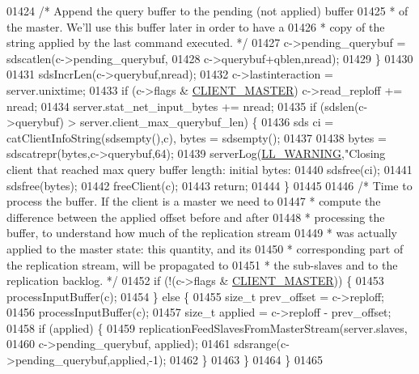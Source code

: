 \begin{DoxyCode}
{{{{{{{{{{{{{{{{01424         \textcolor{comment}{/* Append the query buffer to the pending (not applied) buffer}
01425 \textcolor{comment}{         * of the master. We'll use this buffer later in order to have a}
01426 \textcolor{comment}{         * copy of the string applied by the last command executed. */}
01427         c->pending\_querybuf = sdscatlen(c->pending\_querybuf,
01428                                         c->querybuf+qblen,nread);
01429     \}
01430 
01431     sdsIncrLen(c->querybuf,nread);
01432     c->lastinteraction = server.unixtime;
01433     \textcolor{keywordflow}{if} (c->flags & \hyperlink{server_8h_a3d8f0cc8d0653ee2b6dafb454292c069}{CLIENT\_MASTER}) c->read\_reploff += nread;
01434     server.stat\_net\_input\_bytes += nread;
01435     \textcolor{keywordflow}{if} (sdslen(c->querybuf) > server.client\_max\_querybuf\_len) \{
01436         sds ci = catClientInfoString(sdsempty(),c), bytes = sdsempty();
01437 
01438         bytes = sdscatrepr(bytes,c->querybuf,64);
01439         serverLog(\hyperlink{server_8h_a31229b9334bba7d6be2a72970967a14b}{LL\_WARNING},\textcolor{stringliteral}{"Closing client that reached max query buffer length: %
       initial bytes: %
01440         sdsfree(ci);
01441         sdsfree(bytes);
01442         freeClient(c);
01443         \textcolor{keywordflow}{return};
01444     \}
01445 
01446     \textcolor{comment}{/* Time to process the buffer. If the client is a master we need to}
01447 \textcolor{comment}{     * compute the difference between the applied offset before and after}
01448 \textcolor{comment}{     * processing the buffer, to understand how much of the replication stream}
01449 \textcolor{comment}{     * was actually applied to the master state: this quantity, and its}
01450 \textcolor{comment}{     * corresponding part of the replication stream, will be propagated to}
01451 \textcolor{comment}{     * the sub-slaves and to the replication backlog. */}
01452     \textcolor{keywordflow}{if} (!(c->flags & \hyperlink{server_8h_a3d8f0cc8d0653ee2b6dafb454292c069}{CLIENT\_MASTER})) \{
01453         processInputBuffer(c);
01454     \} \textcolor{keywordflow}{else} \{
01455         size\_t prev\_offset = c->reploff;
01456         processInputBuffer(c);
01457         size\_t applied = c->reploff - prev\_offset;
01458         \textcolor{keywordflow}{if} (applied) \{
01459             replicationFeedSlavesFromMasterStream(server.slaves,
01460                     c->pending\_querybuf, applied);
01461             sdsrange(c->pending\_querybuf,applied,-1);
01462         \}
01463     \}
01464 \}
01465 
}}}}}}}}}}}}}}}}}
\end{DoxyCode}
